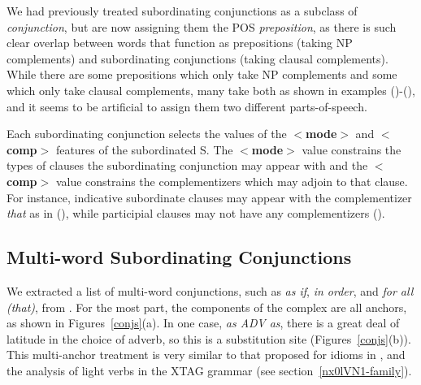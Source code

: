 
We had previously treated subordinating conjunctions as a subclass of
{\em conjunction}, but are now assigning them the POS {\em
preposition}, as there is such clear overlap between words that
function as prepositions (taking NP complements) and subordinating
conjunctions (taking clausal complements). While there are some
prepositions which only take NP complements and some which only take
clausal complements, many take both as shown in examples
()-(), and it seems to be artificial to assign them two
different parts-of-speech.


Each subordinating conjunction selects the values of the {\bf
$<$mode$>$} and {\bf $<$comp$>$} features of the subordinated S. The
{\bf $<$mode$>$} value constrains the types of clauses the
subordinating conjunction may appear with and the {\bf $<$comp$>$}
value constrains the complementizers which may adjoin to that
clause. For instance, indicative subordinate clauses may appear with
the complementizer {\it that} as in (), while participial
clauses may not have any complementizers ().


\subsection{Multi-word Subordinating Conjunctions}

We extracted a list of multi-word conjunctions, such as {\it as if},
{\it in order}, and {\it for all (that)}, from \cite{quirk85}. For the
most part, the components of the complex are all anchors, as shown in
Figures~\ref{conjs}(a). In one case, {\it as ADV as}, there is a great
deal of latitude in the choice of adverb, so this is a substitution
site (Figures~\ref{conjs}(b)). This multi-anchor treatment is very
similar to that proposed for idioms in \cite{AS89}, and the analysis
of light verbs in the XTAG grammar (see section~\ref{nx0lVN1-family}).


